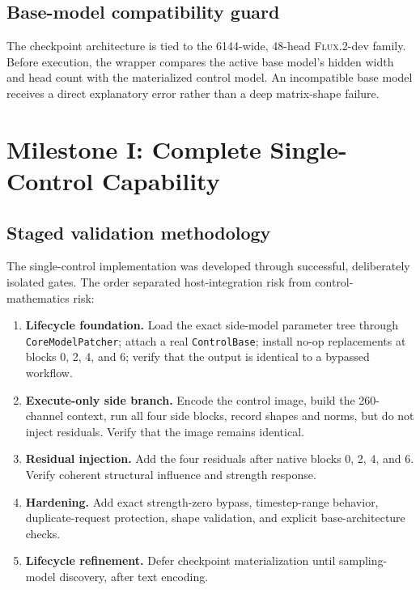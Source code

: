 \documentclass[11pt]{article}
\newcommand{\FluxTwo}{\textsc{Flux.2}}
\newcommand{\code}[1]{\texttt{#1}}
\begin{document}
\subsection{Base-model compatibility guard}

The checkpoint architecture is tied to the 6144-wide, 48-head \FluxTwo{}-dev family. Before execution, the wrapper compares the active base model's hidden width and head count with the materialized control model. An incompatible base model receives a direct explanatory error rather than a deep matrix-shape failure.

\section{Milestone I: Complete Single-Control Capability}

\subsection{Staged validation methodology}

The single-control implementation was developed through successful, deliberately isolated gates. The order separated host-integration risk from control-mathematics risk:

\begin{enumerate}
  \item \textbf{Lifecycle foundation.} Load the exact side-model parameter tree through \code{CoreModelPatcher}; attach a real \code{ControlBase}; install no-op replacements at blocks 0, 2, 4, and 6; verify that the output is identical to a bypassed workflow.
  \item \textbf{Execute-only side branch.} Encode the control image, build the 260-channel context, run all four side blocks, record shapes and norms, but do not inject residuals. Verify that the image remains identical.
  \item \textbf{Residual injection.} Add the four residuals after native blocks 0, 2, 4, and 6. Verify coherent structural influence and strength response.
  \item \textbf{Hardening.} Add exact strength-zero bypass, timestep-range behavior, duplicate-request protection, shape validation, and explicit base-architecture checks.
  \item \textbf{Lifecycle refinement.} Defer checkpoint materialization until sampling-model discovery, after text encoding.
\end{enumerate}
\end{document}
